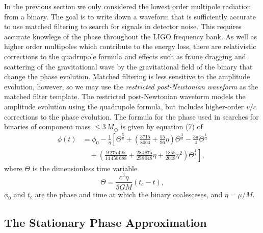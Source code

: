 In the previous section we only considered the lowest order multipole
radiation from a binary. The goal is to write down a waveform that is
sufficiently accurate to use matched filtering to search for signals in
detector noise. This requires accurate knowlege of the phase throughout the
LIGO frequency bank. As well as higher order multipoles which contribute to the
energy loss, there are relativistic corrections to the quadrupole formula and
effects such as frame dragging and scattering of the gravitational wave by the
gravitational field of the binary that change the phase evolution. Matched
filtering is less sensitive to the amplitude evolution, however, so we may use
the \emph{restricted post-Newtonian waveform} as the matched filter template.
The restricted post-Newtonian waveform models the amplitude evolution using
the quadrupole formula, but includes higher-order $v/c$ corrections to the phase
evolution. The formula for the phase used in searches for binaries of
component mass $\le 3\,M_\odot$ is given by equation (7) of
\cite{Blanchet:1996pi}
\begin{equation}
\begin{split}
\phi(t) &= \phi_0 - \frac{1}{\eta} \left[ 
\Theta^\frac{5}{8} + \left(\frac{3715}{8064} + \frac{55}{96}\eta\right)
\Theta^\frac{3}{8} - \frac{3\pi}{4} \Theta^\frac{1}{4} \right. \\
&\quad 
+\left. \left(\frac{9\,275\,495}{14\,450\,688} + \frac{284\,875}{258\,048}\eta +
\frac{1855}{2048} \eta^2\right) \Theta^\frac{1}{8} \right],
\label{eq:biwwphase}
\end{split}
\end{equation}
where $\Theta$ is the dimensionless time variable
\begin{equation}
\Theta = \frac{c^3\eta}{5GM}(t_c - t),
\end{equation}
$\phi_0$ and $t_c$ are the phase and time at which the binary coalesceses, and
$\eta = \mu / M$.

\subsection{The Stationary Phase Approximation}
\label{ss:stationaryphase}

